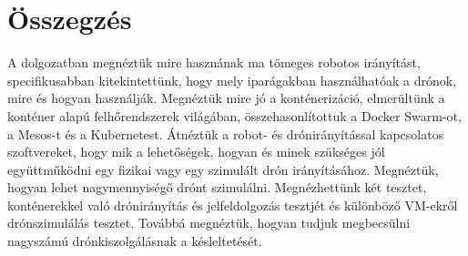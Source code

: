 \chapter*{Összegzés}
A dolgozatban megnéztük mire hasznának ma tömeges robotos irányítást, specifikusabban kitekintettünk, hogy mely iparágakban használhatóak a drónok, mire és hogyan használják. Megnéztük mire jó a konténerizáció, elmerültünk a konténer alapú felhőrendszerek világában, összehasonlítottuk a Docker Swarm-ot, a Mesos-t és a Kubernetest. Átnéztük a robot- és drónirányítással kapcsolatos szoftvereket, hogy mik a lehetőségek, hogyan és minek szükséges jól együttműködni egy fizikai vagy egy szimulált drón irányításához. Megnéztük, hogyan lehet nagymennyiségő drónt szimulálni. Megnézhettünk két tesztet, konténerekkel való drónirányítás és jelfeldolgozás tesztjét és különböző VM-ekről drónszimulálás tesztet. Továbbá megnéztük, hogyan tudjuk megbecsülni nagyszámú drónkiszolgálásnak a késleltetését.